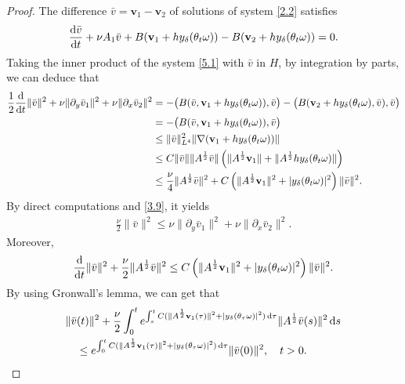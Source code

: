 \documentclass{elsarticle}
\theoremstyle{definition}
\numberwithin{equation}{section}
\renewcommand{\d}{{\rm{d}}}
\begin{document}
\begin{proof}
The  difference $\bar{v}  =\textbf{v}_1-\textbf{v}_2$ of   solutions of system \eqref{2.2}  satisfies
\begin{align}\label{5.1}
\frac{\d \bar{v}}{
\d t}+  \nu  A_1\bar{v}+B( \textbf{v}_1+hy_\delta(\theta_t\omega))-B( \textbf{v}_2+hy_\delta(\theta_t\omega))=0.
\end{align}
Taking the inner product of the system   \eqref{5.1} with $\bar{v}$ in $H$,  by integration by parts, we can deduce that
\begin{align*}
\frac{1}{2}\frac{\d}{\d t}\|\bar{v}\|^2+ \nu  \|\partial_y\bar{v}_1\|^2+\nu  \|\partial_x\bar{v}_2\|^2&=- \big (B(\bar{v},\textbf{v}_1+hy_\delta(\theta_t\omega)),\bar{v} \big )
-\big (B(\textbf{v}_2+hy_\delta(\theta_t\omega),\bar{v}),\bar{v}\big )\nonumber\\
&=-\big (B(\bar{v},\textbf{v}_1+hy_\delta(\theta_t\omega)),\bar{v} \big )\nonumber\\
&\leq \|\bar{v}\|^2_{L^4}\|\nabla(\textbf{v}_1+hy_\delta(\theta_t\omega))\|\nonumber\\
&\leq C\|\bar{v}\|\|A^{\frac12}\bar{v}\| \left (\|A^\frac12\textbf{v}_1\|+\|A^\frac12hy_\delta(\theta_t\omega)\| \right)\nonumber\\
&\leq \frac\nu4\|A^{\frac12}\bar{v}\|^2+C \left(\|A^\frac12\textbf{v}_1\|^2+|y_\delta(\theta_t\omega)|^2 \right )\|\bar{v}\|^2.
\end{align*}
By direct computations and \eqref{3.9}, it yields
\begin{align*}
 \frac{\nu}{2}\|\bar{v}\|^2\leq\nu  \|\partial_y\bar{v}_1\|^2+\nu  \|\partial_x\bar{v}_2\|^2.
\end{align*}
Moreover,
\begin{align*}
\frac{\d}{\d t}\|\bar{v}\|^2+  \frac{\nu}{2} \|A^{\frac12}\bar{v}\|^2
\leq C\left (\|A^\frac12\textbf{v}_1\|^2+|y_\delta(\theta_t\omega)|^2 \right) \|\bar{v}\|^2.
\end{align*}
By using Gronwall's lemma, we can  get that
\begin{align} \label{mar9.1}
 & \|\bar{v}(t)\|^2+  \frac{\nu}{2} \int_0^te^{\int_s^tC(\|A^\frac12\textbf{v}_1(\tau) \|^2+|y_\delta(\theta_\tau\omega)|^2)\, \d \tau}\|A^{\frac12}\bar{v} (s) \|^2\, \d s \nonumber \\
& \quad
\leq e^{\int_0^tC(\|A^\frac12\textbf{v}_1(\tau)\|^2+|y_\delta(\theta_\tau\omega)|^2)\, \d \tau}\|\bar{v}(0)\|^2, \quad t>0.
\end{align}


\end{proof}
\end{document}
